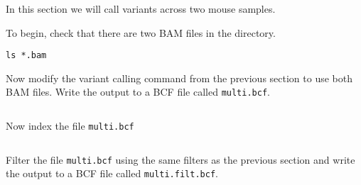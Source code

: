 \documentclass[11pt]{article}
\makeatletter
\newcommand{\boxspacing}{\kern\kvtcb@left@rule\kern\kvtcb@boxsep}
\newcommand{\prompt}[4]{
        {\ttfamily\llap{{\color{#2}[#3]:\hspace{3pt}#4}}\vspace{-\baselineskip}}
    }
\makeatother
\begin{document}
In this section we will call variants across two mouse samples.

To begin, check that there are two BAM files in the directory.

    \begin{tcolorbox}[breakable, size=fbox, boxrule=1pt, pad at break*=1mm,colback=cellbackground, colframe=cellborder]
\prompt{In}{incolor}{ }{\boxspacing}
\begin{Verbatim}[commandchars=\\\{\}]
ls *.bam
\end{Verbatim}
\end{tcolorbox}

    Now modify the variant calling command from the previous section to use
both BAM files. Write the output to a BCF file called
\texttt{multi.bcf}.

    \begin{tcolorbox}[breakable, size=fbox, boxrule=1pt, pad at break*=1mm,colback=cellbackground, colframe=cellborder]
\prompt{In}{incolor}{ }{\boxspacing}
\begin{Verbatim}[commandchars=\\\{\}]

\end{Verbatim}
\end{tcolorbox}

    Now index the file \texttt{multi.bcf}

    \begin{tcolorbox}[breakable, size=fbox, boxrule=1pt, pad at break*=1mm,colback=cellbackground, colframe=cellborder]
\prompt{In}{incolor}{ }{\boxspacing}
\begin{Verbatim}[commandchars=\\\{\}]

\end{Verbatim}
\end{tcolorbox}

    Filter the file \texttt{multi.bcf} using the same filters as the
previous section and write the output to a BCF file called
\texttt{multi.filt.bcf}.

    \begin{tcolorbox}[breakable, size=fbox, boxrule=1pt, pad at break*=1mm,colback=cellbackground, colframe=cellborder]
\prompt{In}{incolor}{ }{\boxspacing}
\begin{Verbatim}[commandchars=\\\{\}]

\end{Verbatim}
\end{tcolorbox}
\end{document}
